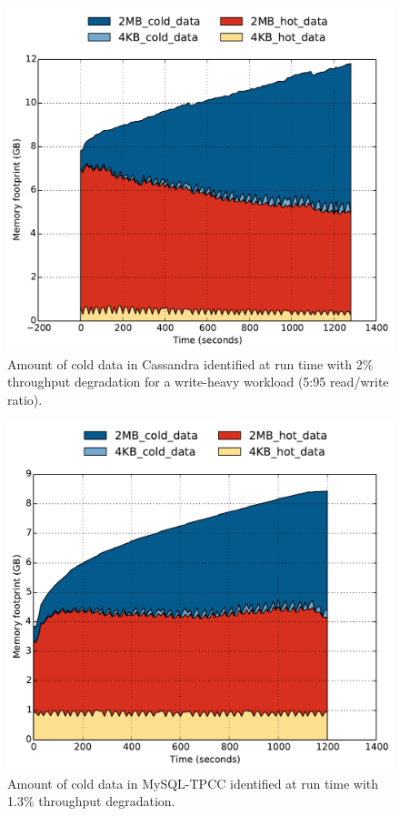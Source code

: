 \begin{figure}[t]
\centering
\includegraphics[width=0.8\columnwidth]{asplos2017/figures/cassandra-new-set-policy-kstaled10-sample5-period3-capacity_over_time.pdf}
\caption{Amount of cold data in Cassandra identified at run time with 2\%
throughput degradation for a write-heavy workload (5:95 read/write ratio).}
\label{fig:cassandra-capacity}
\end{figure}

\begin{figure}[t]
\centering
\includegraphics[width=0.8\columnwidth]{asplos2017/figures/tpcc-clipped-new-policy-capacity_over_time.pdf}
\caption{Amount of cold data in MySQL-TPCC identified at run time with 1.3\%
throughput degradation.}
\label{fig:tpcc-capacity}
\end{figure}

